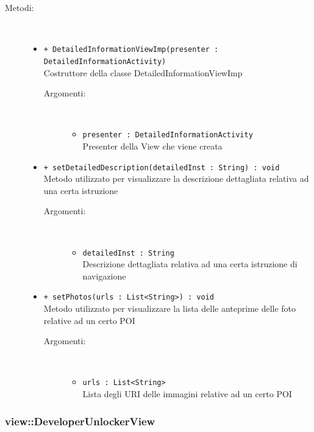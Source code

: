 \documentclass[../DefinizioneDiProdotto.tex]{subfiles}
\begin{document}
\begin{description}
\begin{itemize}
\end{itemize}
\item[Metodi:] \
\begin{itemize}
\item \texttt{+ DetailedInformationViewImp(presenter : DetailedInformationActivity)}\\
Costruttore della classe DetailedInformationViewImp
 \begin{description}
\item[Argomenti:] \
\begin{itemize}
\item \texttt{presenter : DetailedInformationActivity}\\
Presenter della View che viene creata\end{itemize}
\end{description}
\item \texttt{+ setDetailedDescription(detailedInst : String) : void}\\
Metodo utilizzato per visualizzare la descrizione dettagliata relativa ad una certa istruzione
 \begin{description}
\item[Argomenti:] \
\begin{itemize}
\item \texttt{detailedInst : String}\\
Descrizione dettagliata relativa ad una certa istruzione di navigazione\end{itemize}
\end{description}
\item \texttt{+ setPhotos(urls : List<String>) : void}\\
Metodo utilizzato per visualizzare la lista delle anteprime delle foto relative ad un certo POI
 \begin{description}
\item[Argomenti:] \
\begin{itemize}
\item \texttt{urls : List<String>}\\
Lista degli URI delle immagini relative ad un certo POI\end{itemize}
\end{description}
\end{itemize}
\end{description}

\subsubsection{view::DeveloperUnlockerView}
\end{document}
